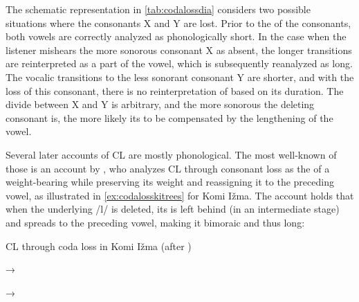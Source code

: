 \documentclass[output=paper,
modfonts
]{LSP/langsci}
\begin{document}
The schematic representation in \cref{tab:codalossdia} considers two possible situations
where the consonants X and Y are lost. Prior to the  of the
consonants, both vowels are correctly analyzed as phonologically short.
In the case when the listener mishears the more sonorous consonant X as
absent, the longer transitions are reinterpreted as a part of the vowel,
which is subsequently reanalyzed as long. The vocalic transitions to the
less sonorant consonant Y are shorter, and with the loss of this
consonant, there is no reinterpretation of  based on its
duration. The divide between X and Y is arbitrary, and the more sonorous
the deleting consonant is, the more likely its  to be
compensated by the lengthening of the vowel.

\largerpage
Several later accounts of CL are mostly phonological. The most
well-known of those is an account by \citet{hayes1989k}, who analyzes CL
through consonant loss as the  of a weight-bearing  while
preserving its weight and reassigning it to the preceding vowel, as
illustrated in \cref{ex:codalosskitrees} for Komi Ižma. The account holds that when the
underlying  /l/ is deleted, its  is left behind (in an
intermediate stage) and spreads to the preceding vowel, making it
bimoraic and thus long:

\ea\label{ex:codalosskitrees}CL through coda loss in Komi Ižma (after \citealt{hayes1989k})\\
 →
 →
\z 
\end{document}
